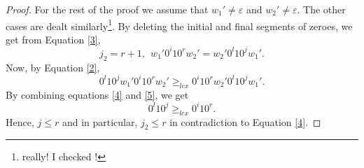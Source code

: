 \documentclass{article}
\theoremstyle{definition}
\begin{document}
\begin{proof}
	For the rest of the proof we assume that $w_1'\neq\varepsilon$ and $w_2'\neq \varepsilon$. The other cases are dealt similarly\footnote{really! I checked !}.
	By deleting the initial and final segments of zeroes, we get from Equation \ref{3},
	\begin{equation}
	\label{4}
	j_2=r+1, \ \ w_1'0^i10^rw_2'=w_2'0^l10^jw_1'.
	\end{equation}
	Now, by Equation \ref{2}, 
	\begin{equation}
	\label{5}
	0^l10^jw_1'0^i10^rw_2'\geq_{lex} 0^i10^rw_2'0^l10^{j}w_1'.
	\end{equation}
	By combining equations \ref{4} and \ref{5}, we get 
	\begin{equation}
	0^l10^j\geq_{lex}0^i10^r.
	\end{equation}
	Hence, $j\leq r$ and in particular, $j_2\leq r$ in contradiction to Equation \ref{4}.
\end{proof}


		
\end{document}
